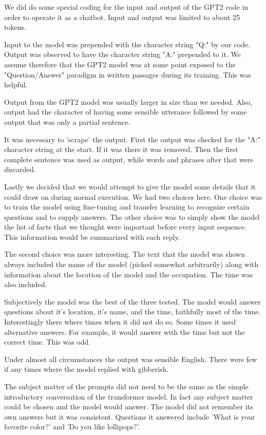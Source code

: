 We did do some special coding for the input and output of the GPT2 code in order to operate it as
a chatbot. Input and output was limited to about 25 tokens. 

Input to the model was prepended with the character string "Q:" by our code. Output was observed 
to have the character string "A:" prepended to it. We assume therefore that the GPT2 model was at some point
exposed to the "Question/Answer" paradigm in written passages during its training. This was helpful.

Output from the GPT2 model was 
usually larger in size than we needed. Also, output had the character of having some sensible utterance followed by some output that was only a partial sentence.

It was necessary to 'scrape' the output. First the output was checked for the "A:" character string at the start. If it was there it was removed. Then the first complete sentence was used as output, while words and phrases after that were discarded.

Lastly we decided that we would attempt to give the model some details that it could draw on 
during normal execution. We had two choices here. One choice was to train the model using fine-tuning and transfer learning to recognize certain questions and to supply answers. The other
choice was to simply show the model the list of facts that we thought were important before 
every input sequence. This information would be summarized with each reply.

The second choice was more interesting. The text that the model was shown always included the name of 
the model (picked somewhat arbitrarily) along with information about the location of the model
and the occupation. The time was also included.

Subjectively the model was the best of the three tested. The model would answer questions about it's location, it's name, and the time, faithfully most
of the time. Interestingly there where times when it did not do so. Some times it used 
alternative answers. For example, it would answer with the time but not the correct time. This was odd.

Under almost all circumstances the output was sensible English. There were few if any times 
where the model replied with gibberish. 

The subject matter of the prompts did not need to be the
same as the simple introductory conversation of the transformer model. In fact any subject matter
could be chosen and the model would answer. The model did not remember its own answers but it
was consistent. Questions it answered include 'What is your favorite color?' and 'Do you like lollipops?'. 

